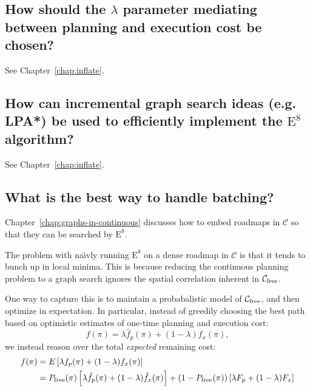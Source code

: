 \documentclass{report}
\begin{document}
{
\renewcommand\thesubsection{Q\arabic{subsection}}

\subsection{How should the $\lambda$ parameter mediating
   between planning and execution cost be chosen?}
\label{ques:choosing-lambda}

See Chapter~\ref{chap:inflate}.

\subsection{How can incremental graph search ideas (e.g. LPA*)
   be used to efficiently implement the $\mbox{E}^8$ algorithm?}
\label{ques:incremental-search}

See Chapter~\ref{chap:inflate}.

\subsection{What is the best way to handle batching?}
\label{ques:batching}

Chapter~\ref{chap:graphs-in-continuous}
discusses how to embed roadmaps in $\mathcal{C}$
so that they can be searched by $\mbox{E}^8$.

The problem with na\"{\i}vly running $\mbox{E}^8$ on a
dense roadmap in $\mathcal{C}$
is that it tends to bunch up in local minima.
This is because reducing the continuous planning problem
to a graph search ignores the spatial correlation
inherent in $\mathcal{C}_{\mbox{\scriptsize free}}$.

One way to capture this is to maintain a probabalistic model
of $\mathcal{C}_{\mbox{\scriptsize free}}$,
and then optimize in expectation.
In particular,
instead of greedily choosing the best path based on
optimistic estimates of one-time planning and execution cost:
\begin{equation}
   f(\pi) = \lambda \hat{f}_p(\pi) + (1-\lambda) \hat{f}_x(\pi),
\end{equation}
we instead reason over the total \emph{expected} remaining cost:
\begin{align}
   f(\pi)
      &= E \left[ \lambda f_p(\pi) + (1-\lambda) f_x(\pi) \right] \\
   &= P_{\mbox{\scriptsize free}}(\pi)
      \left[ \lambda \hat{f}_p(\pi) + (1-\lambda) \hat{f}_x(\pi) \right]
      + (1-P_{\mbox{\scriptsize free}}(\pi))
      \left[ \lambda F_p + (1-\lambda) F_x \right]
\end{align}

}
\end{document}
